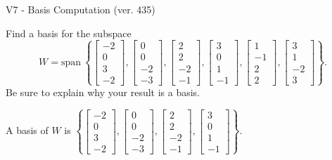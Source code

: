 \begin{exercise}
  \begin{exerciseTitle}V7 - Basis Computation (ver. 435)\end{exerciseTitle}
  \begin{exerciseStatement}
    Find a basis for the subspace 
\[W=\mathrm{span}\ \left\{\left[\begin{array}{r}
-2 \\
0 \\
3 \\
-2
\end{array}\right] , \left[\begin{array}{r}
0 \\
0 \\
-2 \\
-3
\end{array}\right] , \left[\begin{array}{r}
2 \\
2 \\
-2 \\
-1
\end{array}\right] , \left[\begin{array}{r}
3 \\
0 \\
1 \\
-1
\end{array}\right] , \left[\begin{array}{r}
1 \\
-1 \\
2 \\
2
\end{array}\right] , \left[\begin{array}{r}
3 \\
1 \\
-2 \\
3
\end{array}\right]\right\}.\]
 Be sure to explain why your result is a basis.


  \end{exerciseStatement}
  \begin{exerciseAnswer}
   A basis of \(W\) is  \(\left\{\left[\begin{array}{r}
-2 \\
0 \\
3 \\
-2
\end{array}\right] , \left[\begin{array}{r}
0 \\
0 \\
-2 \\
-3
\end{array}\right] , \left[\begin{array}{r}
2 \\
2 \\
-2 \\
-1
\end{array}\right] , \left[\begin{array}{r}
3 \\
0 \\
1 \\
-1
\end{array}\right]\right\}\).
  


  \end{exerciseAnswer}
\end{exercise}